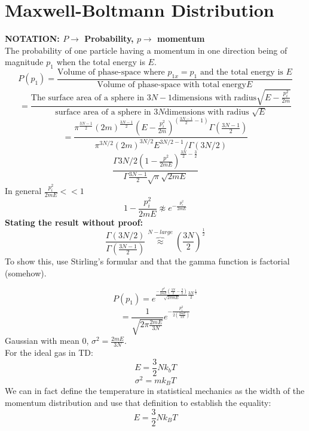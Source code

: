 \documentclass[11pt]{book}
\theoremstyle{definition}
\begin{document}
\section{Maxwell-Boltmann Distribution}
\textbf{NOTATION: $ P \to $ Probability, $ p \to$ momentum  } \\
The probability of one particle having a momentum in one direction being of magnitude $ p_1 $ when the total energy is $ E $.
\[ P(p_1) = \frac{\text{Volume of phase-space where }p_{1x} = p_1 \text{ and the total energy is }E}{\text{Volume of phase-space with total energy} E}\] 
\[ = \frac{\text{The surface area of a sphere in }3N-1 \text{dimensions with radius} \sqrt{E-\frac{p_i^2}{2m}}}{\text{surface area of a sphere in }3N \text{dimensions with radius }\sqrt{E}} \] 
\[  = \frac{\pi ^{\frac{3N-1}{2}} (2m)^{\frac{3N-1}{2}} (E- \frac{p_i^2}{2m})^{(\frac{3N-1}{2}-1)} \Gamma(\frac{3N-1}{2})}{\pi ^{3N/2} (2m)^{3N/2} E^{3N/2 - 1} / \Gamma(3N/2)} \] 
\[ \frac{\Gamma{3N/2}\left(1-\frac{p^2}{2mE}\right)^{\frac{3N}{2}-\frac{3}{2}}}{\Gamma{\frac{3N-1}{2}}\sqrt{\pi}\sqrt{2mE}} \] 
In general $ \frac{p_i^2}{2mE} << 1 $
\[ 1 - \frac{p_i^2}{2mE} \not \approx e^{-\frac{p_i^2}{2mE}} \] 
\textbf{Stating the result without proof:} 
\[ \frac{\Gamma(3N/2)}{\Gamma(\frac{3N-1}{2})} \overbrace{\approx}^{N-large} \left (\frac{3N}{2} \right)^{ \frac{1}{2} } \]
To show this, use Stirling's formular and that the gamma function is factorial (somehow).

\[ P(p_1) = e^{\frac{-\frac{P^2}{2mE}(\frac{3N}{2} - \frac{3}{2})}{\sqrt{2 \pi m E}} \frac{3N}{2}^{ \frac{1}{2} }} \] 
\[  = \frac{1}{\sqrt{2 \pi \frac{2mE}{3N}}} e^{-\frac{p_i^2}{2\left( \frac{2mE}{3N} \right) }}\] 
Gaussian with mean $ 0 $, $ \sigma^2 = \frac{2mE}{3N} $. \\
For the ideal gas in TD:
\[ E = \frac{3}{2}Nk_bT \] 
\[ \sigma^2 = mk_BT \] 
We can in fact define the temperature in statistical mechanics as the width of the momentum distribution and use that definition to establish the equality: \[ E = \frac{3}{2}Nk_BT \] 
\end{document}
